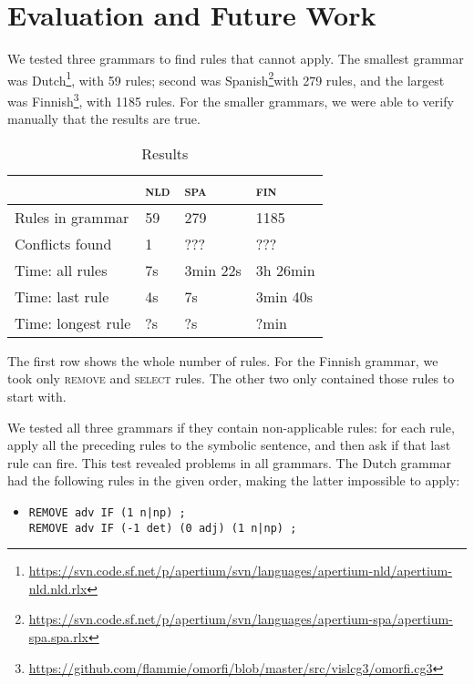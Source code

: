 \section{Evaluation and Future Work}
\label{sec:eval}

We tested three grammars to find rules that cannot apply. The smallest grammar was Dutch\footnote{\url{https://svn.code.sf.net/p/apertium/svn/languages/apertium-nld/apertium-nld.nld.rlx}}, with 59 rules; second was Spanish\footnote{\url{https://svn.code.sf.net/p/apertium/svn/languages/apertium-spa/apertium-spa.spa.rlx}}with 279 rules, and the largest was Finnish\footnote{\url{https://github.com/flammie/omorfi/blob/master/src/vislcg3/omorfi.cg3}}, with 1185 rules.
For the smaller grammars, we were able to verify manually that the results are true.

\begin{table}[]
\centering
\begin{tabular}{|l|l|l|l|}
\hline
                      & \textsc{nld}  & \textsc{spa}  & \textsc{fin}  \\ \hline
Rules in grammar      & 59              & 279               & 1185     \\ \hline
Conflicts found       & 1               & ???               & ???    \\ \hline
Time: all rules       & 7s              & 3min 22s          & 3h 26min    \\ \hline
Time: last rule       & 4s              & 7s                & 3min 40s    \\ \hline
Time: longest rule    & ?s              & ?s                & ?min     \\ \hline

\end{tabular}
\caption{Results}
\label{table:res}
\end{table}

The first row shows the whole number of rules. For the Finnish grammar, we took only \textsc{remove} and \textsc{select} rules. The other two only contained those rules to start with.

We tested all three grammars if they contain non-applicable rules:
for each rule, apply all the preceding rules to the symbolic sentence, and then ask if that last rule can fire.
This test revealed problems in all grammars.
The Dutch grammar had the following rules in the given order, making the latter impossible to apply:

\begin{itemize}
\item[] 
\begin{verbatim}REMOVE adv IF (1 n|np) ;
REMOVE adv IF (-1 det) (0 adj) (1 n|np) ;
\end{verbatim}
\end{itemize}


